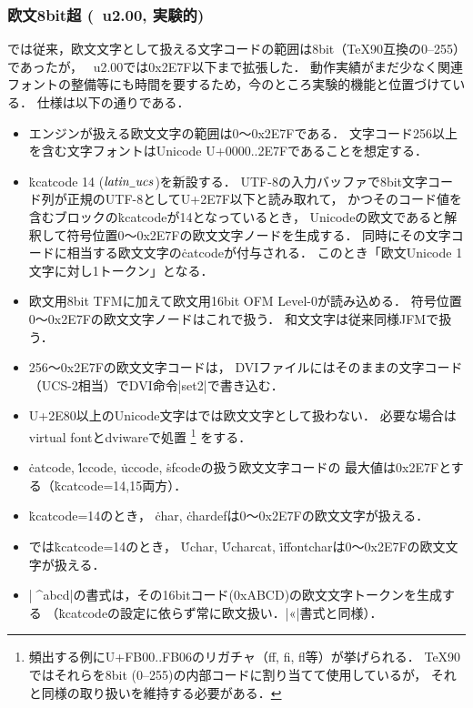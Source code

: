 \documentclass[a4paper,11pt,nomag,dvipdfmx]{jsarticle}
\def\_{\leavevmode\vrule width .45em height -.2ex depth .3ex\relax}
\begin{document}
\subsubsection{欧文8bit超 (\upTeX~u2.00, 実験的)}\label{sec:uptex_ofm}
\upTeX では従来，欧文文字として扱える文字コードの範囲は8bit（\TeX90互換の0--255）であったが，
\upTeX~u2.00では0x2E7F以下まで拡張した\cite{tjb170}．
動作実績がまだ少なく関連フォントの整備等にも時間を要するため，今のところ実験的機能と位置づけている．
仕様は以下の通りである．
\begin{itemize}
 \item \upTeX エンジンが扱える欧文文字の範囲は0～0x2E7Fである．
   文字コード256以上を含む文字フォントはUnicode U+0000..2E7Fであることを想定する．
 \item \.{kcatcode} 14 ($\mathit{latin\_ucs}$)を新設する．
   UTF-8の入力バッファで8bit文字コード列が正規のUTF-8としてU+2E7F以下と読み取れて，
   かつそのコード値を含むブロックの\.{kcatcode}が14となっているとき，
   Unicodeの欧文であると解釈して符号位置0～0x2E7Fの欧文文字ノードを生成する．
   同時にその文字コードに相当する欧文文字の\.{catcode}が付与される．
   このとき「欧文Unicode 1文字に対し1トークン」となる．
 \item 欧文用8bit TFMに加えて欧文用16bit OFM Level-0が読み込める．
   符号位置0～0x2E7Fの欧文文字ノードはこれで扱う．
   和文文字は従来同様JFMで扱う．
 \item 256～0x2E7Fの欧文文字コードは，
   DVIファイルにはそのままの文字コード（UCS-2相当）でDVI命令|set2|で書き込む．
 \item U+2E80以上のUnicode文字は\upTeX では欧文文字として扱わない．
   必要な場合はvirtual fontとdviwareで処置%
   \footnote{頻出する例にU+FB00..FB06のリガチャ（ff, fi, fl等）が挙げられる．
   \TeX90ではそれらを8bit (0--255)の内部コードに割り当てて使用しているが，
   それと同様の取り扱いを維持する必要がある．}%
   をする．
 \item \.{catcode}, \.{lccode}, \.{uccode}, \.{sfcode}の扱う欧文文字コードの
   最大値は0x2E7Fとする（\.{kcatcode}=14,15両方）．
 \item \.{kcatcode}=14のとき，
   \.{char}, \.{chardef}は0～0x2E7Fの欧文文字が扱える．
 \item \eupTeX では\.{kcatcode}=14のとき，
   \.{Uchar}, \.{Ucharcat}, \.{iffontchar}は0～0x2E7Fの欧文文字が扱える．
 \item |^^^^abcd|の書式は，その16bitコード(0xABCD)の欧文文字トークンを生成する
   （\.{kcatcode}の設定に依らず常に欧文扱い．|^^ab|書式と同様）．
\end{itemize}
\end{document}
